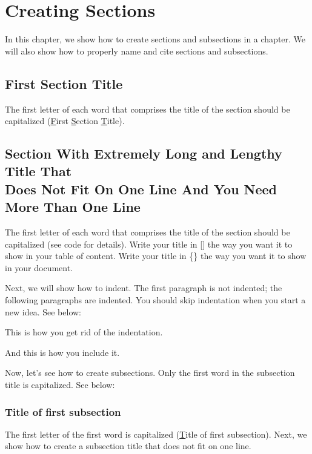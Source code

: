 \chapter{Creating Sections}\label{Chap0_Sections}

\color{blue}In this chapter, we show how to create sections and subsections in a chapter. We will also show how to properly name and cite sections and subsections. 
\color{black}
\section{First Section Title}\label{Section1}
\color{blue} The first letter of each word that comprises the title of the section should be capitalized (\underline{F}irst \underline{S}ection \underline{T}itle). \color{black} 

\section[Section With Extremely Long and Lengthy Title That Does Not Fit On One Line And You Need More Than One Line]{Section With Extremely Long and Lengthy Title That \\ \vskip -3mm Does Not Fit On One Line And You Need More Than One Line} \label{Section1_2}

\color{blue} The first letter of each word that comprises the title of the section should be capitalized (see code for details). Write your title in [] the way you want it to show in your table of content. Write your title in \{\} the way you want it to show in your document. 


Next, we will show how to indent. The first paragraph is not indented; the following paragraphs are indented. You should skip indentation when you start a new idea. See below: 


\noindent This is how you get rid of the indentation.

And this is how you include it.


\color{blue} \noindent Now, let's see how to create subsections. Only the first word in the subsection title is capitalized. See below: \color{black} 
 
\subsection{Title of first subsection} \label{Subsection1_1}
\color{blue} The first letter of the first word is capitalized (\underline{T}itle of first subsection). Next, we show how to create a subsection title that does not fit on one line. 


